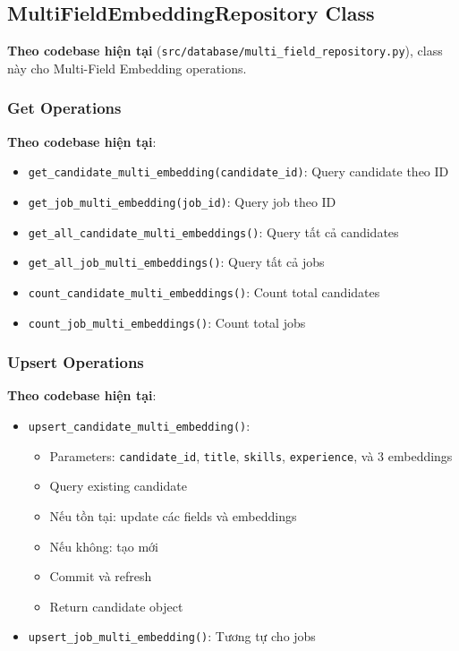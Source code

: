 \subsection{MultiFieldEmbeddingRepository Class}

\textbf{Theo codebase hiện tại} (\texttt{src/database/multi\_field\_repository.py}), class này cho Multi-Field Embedding operations.

\subsubsection{Get Operations}

\textbf{Theo codebase hiện tại}:
\begin{itemize}
    \item \texttt{get\_candidate\_multi\_embedding(candidate\_id)}: Query candidate theo ID
    \item \texttt{get\_job\_multi\_embedding(job\_id)}: Query job theo ID
    \item \texttt{get\_all\_candidate\_multi\_embeddings()}: Query tất cả candidates
    \item \texttt{get\_all\_job\_multi\_embeddings()}: Query tất cả jobs
    \item \texttt{count\_candidate\_multi\_embeddings()}: Count total candidates
    \item \texttt{count\_job\_multi\_embeddings()}: Count total jobs
\end{itemize}

\subsubsection{Upsert Operations}

\textbf{Theo codebase hiện tại}:
\begin{itemize}
    \item \texttt{upsert\_candidate\_multi\_embedding()}:
    \begin{itemize}
        \item Parameters: \texttt{candidate\_id}, \texttt{title}, \texttt{skills}, \texttt{experience}, và 3 embeddings
        \item Query existing candidate
        \item Nếu tồn tại: update các fields và embeddings
        \item Nếu không: tạo mới
        \item Commit và refresh
        \item Return candidate object
    \end{itemize}
    \item \texttt{upsert\_job\_multi\_embedding()}: Tương tự cho jobs
\end{itemize}


